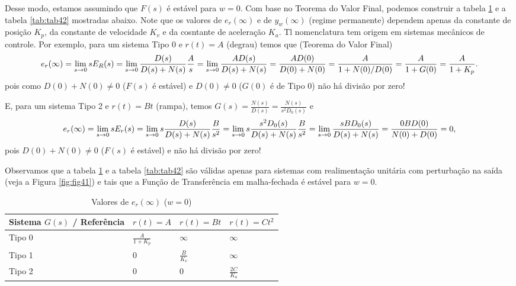 \documentclass[
]{book}
\begin{document}
Desse modo, estamos assumindo que \(F(s)\) é estável para \(w=0\). Com base no Teorema do Valor Final, podemos construir a tabela \ref{tab:tab41} e a tabela \ref{tab:tab42} mostradas abaixo. Note que os valores de \(e_r(\infty)\) e de \(y_w(\infty)\) (regime permanente) dependem apenas da constante de posição \(K_p\), da constante de velocidade \(K_v\) e da cosntante de aceleração \(K_a\). Tl nomenclatura tem origem em sistemas mecânicos de controle. Por exemplo, para um sistema Tipo 0 e \(r(t)=A\) (degrau) temos que (Teorema do Valor Final)
\[
e_r(\infty) = \lim\limits_{s \to 0}{sE_R(s)}=\lim\limits_{s\to0}{\frac{D(s)}{D(s)+N(s)}\frac{A}{s}} = \lim\limits_{s\to0}{\frac{AD(s)}{D(s)+N(s)}} \\
= \frac{AD(0)}{D(0) + N(0)} = \frac{A}{1+N(0)/D(0)} = \frac{A}{1+G(0)} = \frac {A}{1+K_p}.
\]
pois como \(D(0) + N(0) \neq 0\) (\(F(s)\) é estável) e \(D(0) \neq 0\) (\(G(0)\) é de Tipo 0) não há divisão por zero!

E, para um sistema Tipo 2 e \(r(t) = Bt\) (rampa), temos \(G(s) = \frac{N(s)}{D(s)} = \frac{N(s)}{s^2D_0(s)}\) e
\[
e_r(\infty) = \lim\limits_{s \to 0}{sE_r(s) = \lim\limits_{s \to 0}{s\frac{D(s)}{D(s)+N(s)}\frac{B}{s^2}}} = \lim\limits_{s \to 0}{s\frac{s^2D_0(s)}{D(s)+N(s)}\frac{B}{s^2}}\\
=\lim\limits_{s \to 0}{\frac{sBD_0(s)}{D(s)+N(s)}}=\frac{0BD(0)}{N(0)+D(0)}=0,
\]
pois \(D(0) + N(0) \neq 0\) (\(F(s)\) é estável) e não há divisão por zero!

Observamos que a tabela \ref{tab:tab41} e a tabela \ref{tab:tab42} são válidas apenas para sistemas com realimentação unitária com perturbação na saída (veja a Figura \ref{fig:fig41}) e tais que a Função de Transferência em malha-fechada é estável para \(w=0\).

\begin{table}

\caption{\label{tab:tab41}Valores de $e_r(\infty)$ ($w=0$)}
\centering
\begin{tabular}[t]{llll}
\toprule
Sistema $G(s)$ / Referência & $r(t)=A$ & $r(t) = Bt$ & $r(t) = Ct^2$\\
\midrule
Tipo 0 & $\frac{A}{1 + K_p}$ & $\infty$ & $\infty$\\
Tipo 1 & 0 & $\frac{B}{K_v}$ & $\infty$\\
Tipo 2 & 0 & 0 & $\frac{2C}{K_a}$\\
\bottomrule
\end{tabular}
\end{table}
\end{document}
